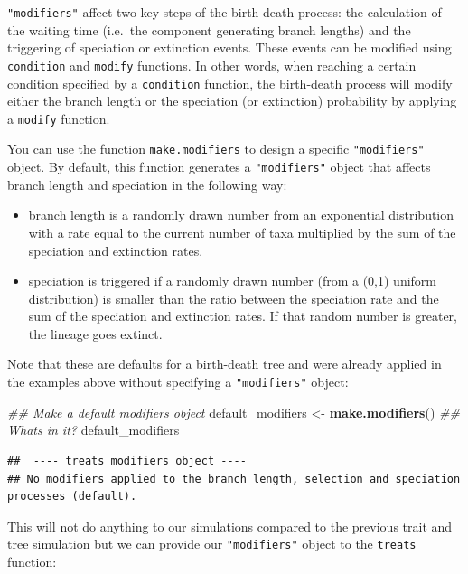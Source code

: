 \documentclass[
]{book}
\newenvironment{Shaded}{\begin{snugshade}}{\end{snugshade}}
\newcommand{\CommentTok}[1]{\textcolor[rgb]{0.56,0.35,0.01}{\textit{#1}}}
\newcommand{\KeywordTok}[1]{\textcolor[rgb]{0.13,0.29,0.53}{\textbf{#1}}}
\newcommand{\NormalTok}[1]{#1}
\newcommand{\StringTok}[1]{\textcolor[rgb]{0.31,0.60,0.02}{#1}}
\providecommand{\tightlist}{%
  \setlength{\itemsep}{0pt}\setlength{\parskip}{0pt}}
\begin{document}
\texttt{"modifiers"} affect two key steps of the birth-death process: the calculation of the waiting time (i.e.~the component generating branch lengths) and the triggering of speciation or extinction events.
These events can be modified using \texttt{condition} and \texttt{modify} functions.
In other words, when reaching a certain condition specified by a \texttt{condition} function, the birth-death process will modify either the branch length or the speciation (or extinction) probability by applying a \texttt{modify} function.

You can use the function \texttt{make.modifiers} to design a specific \texttt{"modifiers"} object.
By default, this function generates a \texttt{"modifiers"} object that affects branch length and speciation in the following way:

\begin{itemize}
\tightlist
\item
  branch length is a randomly drawn number from an exponential distribution with a rate equal to the current number of taxa multiplied by the sum of the speciation and extinction rates.
\item
  speciation is triggered if a randomly drawn number (from a (0,1) uniform distribution) is smaller than the ratio between the speciation rate and the sum of the speciation and extinction rates. If that random number is greater, the lineage goes extinct.
\end{itemize}

Note that these are defaults for a birth-death tree and were already applied in the examples above without specifying a \texttt{"modifiers"} object:

\begin{Shaded}
\begin{Highlighting}[]
\CommentTok{\#\# Make a default modifiers object}
\NormalTok{default\_modifiers \textless{}{-}}\StringTok{ }\KeywordTok{make.modifiers}\NormalTok{()}
\CommentTok{\#\# What\textquotesingle{}s in it?}
\NormalTok{default\_modifiers}
\end{Highlighting}
\end{Shaded}

\begin{verbatim}
##  ---- treats modifiers object ---- 
## No modifiers applied to the branch length, selection and speciation processes (default).
\end{verbatim}

This will not do anything to our simulations compared to the previous trait and tree simulation but we can provide our \texttt{"modifiers"} object to the \texttt{treats} function:
\end{document}
